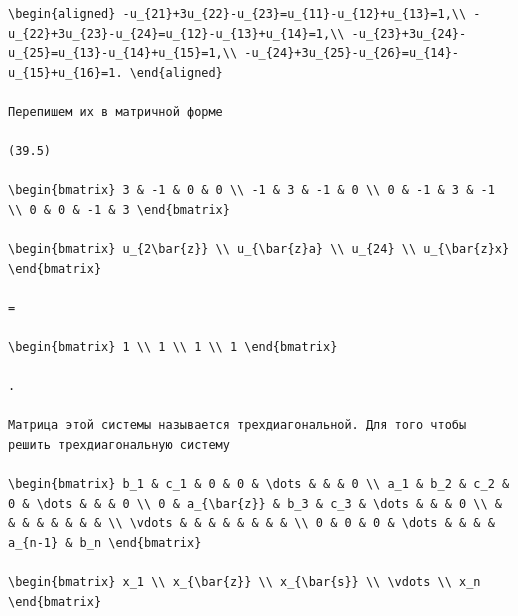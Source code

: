 \documentclass[
  ukrainian,
]{article}
\begin{document}
\begin{verbatim}
\begin{aligned} -u_{21}+3u_{22}-u_{23}=u_{11}-u_{12}+u_{13}=1,\\ -u_{22}+3u_{23}-u_{24}=u_{12}-u_{13}+u_{14}=1,\\ -u_{23}+3u_{24}-u_{25}=u_{13}-u_{14}+u_{15}=1,\\ -u_{24}+3u_{25}-u_{26}=u_{14}-u_{15}+u_{16}=1. \end{aligned}

Перепишем их в матричной форме

(39.5)

\begin{bmatrix} 3 & -1 & 0 & 0 \\ -1 & 3 & -1 & 0 \\ 0 & -1 & 3 & -1 \\ 0 & 0 & -1 & 3 \end{bmatrix}

\begin{bmatrix} u_{2\bar{z}} \\ u_{\bar{z}a} \\ u_{24} \\ u_{\bar{z}x} \end{bmatrix}

=

\begin{bmatrix} 1 \\ 1 \\ 1 \\ 1 \end{bmatrix}

.

Матрица этой системы называется трехдиагональной. Для того чтобы решить трехдиагональную систему

\begin{bmatrix} b_1 & c_1 & 0 & 0 & \dots & & & 0 \\ a_1 & b_2 & c_2 & 0 & \dots & & & 0 \\ 0 & a_{\bar{z}} & b_3 & c_3 & \dots & & & 0 \\ & & & & & & & & \\ \vdots & & & & & & & & \\ 0 & 0 & 0 & \dots & & & & a_{n-1} & b_n \end{bmatrix}

\begin{bmatrix} x_1 \\ x_{\bar{z}} \\ x_{\bar{s}} \\ \vdots \\ x_n \end{bmatrix}


\end{verbatim}
\end{document}

